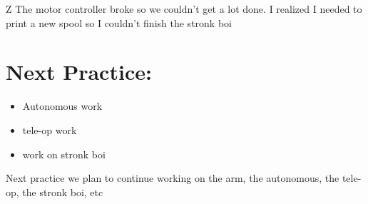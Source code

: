 \documentclass[12pt]{article}
\begin{document}
Z The motor controller broke so we couldn't get a lot done. I realized I needed to print a new spool so I couldn't finish the stronk boi

\section{Next Practice:}
\begin{itemize}
	\item Autonomous work
\item tele-op work
\item work on stronk boi
\end{itemize}

Next practice we plan to continue working on the arm, the autonomous, the tele-op, the stronk boi, etc
\end{document}
